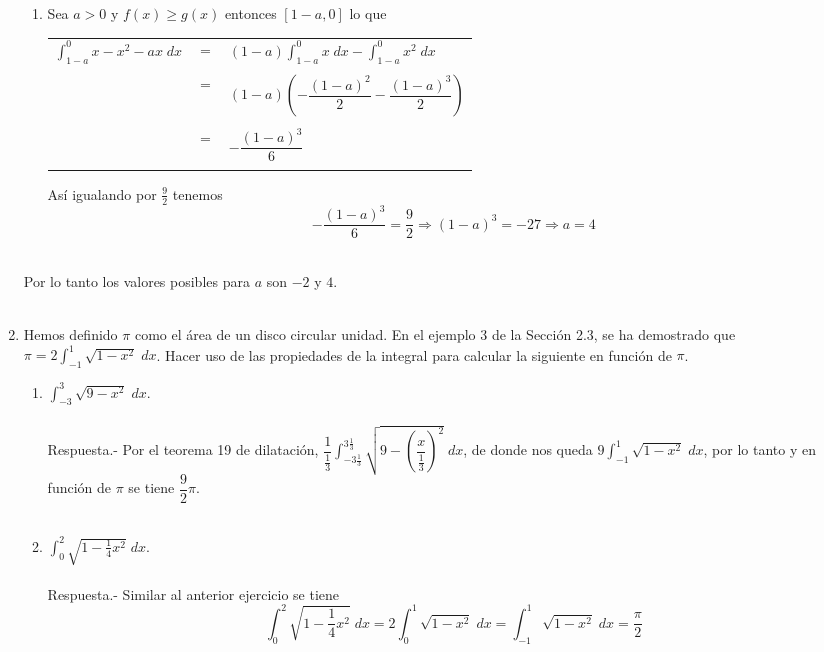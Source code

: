 \begin{enumerate}[\bfseries 1.]
\begin{enumerate}[\bfseries C 1.]
	\item Sea $a>0$ y  $f(x)\geq g(x)$ entonces $[1-a,0]$ lo que 
	    \begin{center}
		\begin{tabular}{rcl}
		    $\displaystyle\int_{1-a}^0 x-x^2-ax \; dx$&$=$&$\displaystyle(1-a)\int_{1-a}^0 x\; dx  - \int_{1-a}^0 x^2 \; dx$\\\\ 
		    &$=$&$(1-a)\left(-\dfrac{(1-a)^2}{2} - \dfrac{(1-a)^3}{2}\right)$\\\\
		    &$=$&$-\dfrac{(1-a)^3}{6}$\\\\
		\end{tabular}
	    \end{center}
	    Así igualando por $\frac{9}{2}$ tenemos 
	    $$-\dfrac{(1-a)^3}{6} = \dfrac{9}{2} \Longrightarrow (1-a)^3 = -27 \Longrightarrow a=4$$\\
    \end{enumerate}
    Por lo tanto los valores posibles para $a$ son $-2$ y $4$.\\\\

\item Hemos definido $\pi$ como el área de un disco circular unidad. En el ejemplo 3 de la Sección 2.3, se ha demostrado que $\pi=2 \int_{-1}^1 \sqrt{1-x^2}\; dx$. Hacer uso de las propiedades de la integral para calcular la siguiente en función de $\pi$.
\begin{enumerate}[\bfseries (a)]

    \item $\displaystyle\int_{-3}^3 \sqrt{9-x^2}\; dx$.\\\\
	Respuesta.-\; Por el teorema 19 de dilatación, $\dfrac{1}{\frac{1}{3}}\displaystyle\int_{-3\frac{1}{3}}^{3\frac{1}{3}} \sqrt{9 - \left(\dfrac{x}{\frac{1}{3}}\right)^2} \; dx$, de donde nos queda $9 \displaystyle\int_{-1}^1 \sqrt{1-x^2}\; dx$, por lo tanto y en función de $\pi$ se tiene $\dfrac{9}{2} \pi$.\\\\

    \item $\displaystyle\int_0^2 \sqrt{1-\frac{1}{4}x^2}\; dx$.\\\\
	Respuesta.-\; Similar al anterior ejercicio se tiene 
	$$\int_0^2 \sqrt{1-\dfrac{1}{4}x^2}\; dx = 2\int_0^1 \sqrt{1-x^2}\; dx = \int_{-1}^1 \sqrt{1-x^2}\; dx = \dfrac{\pi}{2}$$\\


\end{enumerate}
\end{enumerate}
